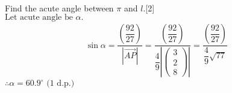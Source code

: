 \documentclass[12pt, a4 paper]{article}
\begin{document}
\begin{outline}[enumerate]
\begin{align*}
					\end{align*}
					\color{black}
					\2 Find the acute angle between $\pi $ and $l$.\hfill[2]
					\color{blue}\\
					${\textrm{Let acute angle be }}\alpha {\textrm{.}}$
					\begin{align*}
						\sin \alpha  = \dfrac{{\left( {\dfrac{{92}}{{27}}} \right)}}{{\left| {\overrightarrow {AP} } \right|}} = \dfrac{{\left( {\dfrac{{92}}{{27}}} \right)}}{{\dfrac{4}{9}\left| {\left( {\begin{array}{*{20}{c}}3 \\2\\8\end{array}} \right)} \right|}} = \dfrac{{\left( {\dfrac{{92}}{{27}}} \right)}}{{\dfrac{4}{9}\sqrt {77} }}
					\end{align*}
					$\therefore \alpha  = 60.9^\circ {\textrm{ (1 d}}{\textrm{.p}}{\textrm{.)}}$
					\color{black}


\end{outline}
\end{document}
